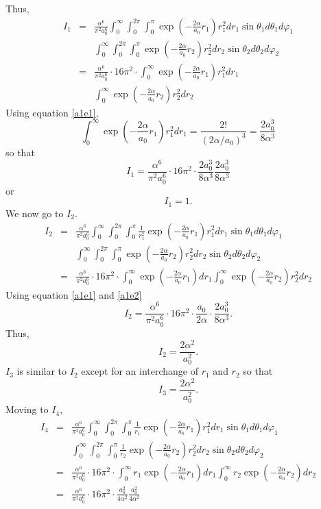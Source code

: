 \documentclass{article}
\numberwithin{equation}{section}
\begin{document}
Thus,
\begin{eqnarray*}
I_1 &=& \frac{\alpha^6}{\pi^2 a_0^6}
\int_0^\infty\int_0^{2\pi}\int_0^\pi\exp\left(-\frac{2\alpha}{a_0}r_1
	\right) r_1^2dr_1\sin\theta_1d\theta_1d\varphi_1 \\
 & & 
\int_0^\infty\int_0^{2\pi}\int_0^\pi\exp\left(-\frac{2\alpha}{a_0}r_2
	\right) r_2^2dr_2\sin\theta_2d\theta_2d\varphi_2 \\
 &=& \frac{\alpha^6}{\pi^2 a_0^6}\cdot 16\pi^2 \cdot
 \int_0^\infty\exp\left(-\frac{2\alpha}{a_0}r_1\right)r_1^2dr_1 \\
 & & \int_0^\infty\exp\left(-\frac{2\alpha}{a_0}r_2\right)r_2^2dr_2 
\end{eqnarray*}
Using equation \eqref{a1e1},
\[
\int_0^\infty\exp\left(-\frac{2\alpha}{a_0}r_1\right)r_1^2dr_1 = 
\frac{2!}{(2\alpha/a_0)^3} = \frac{2a_0^3}{8\alpha^3}
\]
so that
\[
I_1 = \frac{\alpha^6}{\pi^2 a_0^6}\cdot 16\pi^2 \cdot
 \frac{2a_0^3}{8\alpha^3}\frac{2a_0^3}{8\alpha^3}
\]
or
\begin{equation}\label{s5e73}
I_1 = 1.
\end{equation}
We now go to $I_2$.
\begin{eqnarray*}
I_2 &=& \frac{\alpha^6}{\pi^2 a_0^6}
\int_0^\infty\int_0^{2\pi}\int_0^\pi
\frac{1}{r_1^2}\exp\left(-\frac{2\alpha}{a_0}r_1\right)
r_1^2dr_1\sin\theta_1d\theta_1d\varphi_1 \\
 & & 
\int_0^\infty\int_0^{2\pi}\int_0^\pi\exp\left(-\frac{2\alpha}{a_0}r_2
	\right) r_2^2dr_2\sin\theta_2d\theta_2d\varphi_2 \\
 &=& \frac{\alpha^6}{\pi^2 a_0^6}\cdot 16\pi^2 \cdot
 \int_0^\infty\exp\left(-\frac{2\alpha}{a_0}r_1\right)dr_1 
 \int_0^\infty\exp\left(-\frac{2\alpha}{a_0}r_2\right)r_2^2dr_2 
\end{eqnarray*}
Using equation \eqref{a1e1} and \eqref{a1e2}
\[
I_2 = \frac{\alpha^6}{\pi^2 a_0^6}\cdot 16\pi^2 \cdot \frac{a_0}{2\alpha}
\cdot \frac{2a_0^3}{8\alpha^3}.
\]
Thus,
\begin{equation}\label{s5e74}
I_2 = \frac{2\alpha^2}{a_0^2}.
\end{equation}
$I_3$ is similar to $I_2$ except for an interchange of $r_1$ and $r_2$ so
that
\begin{equation}\label{s5e75}
I_3 = \frac{2\alpha^2}{a_0^2}.
\end{equation}
Moving to $I_4$,
\begin{eqnarray*}
I_4 &=& \frac{\alpha^6}{\pi^2 a_0^6}
\int_0^\infty\int_0^{2\pi}\int_0^\pi
\frac{1}{r_1}\exp\left(-\frac{2\alpha}{a_0}r_1\right)
r_1^2dr_1\sin\theta_1d\theta_1d\varphi_1 \\
 & & 
\int_0^\infty\int_0^{2\pi}\int_0^\pi
\frac{1}{r_2}\exp\left(-\frac{2\alpha}{a_0}r_2\right)
r_2^2dr_2\sin\theta_2d\theta_2d\varphi_2 \\
&=& \frac{\alpha^6}{\pi^2 a_0^6} \cdot 16\pi^2 \cdot
\int_0^\infty r_1\exp\left(-\frac{2\alpha}{a_0}r_1\right)dr_1
\int_0^\infty r_2\exp\left(-\frac{2\alpha}{a_0}r_2\right)dr_2 \\
&=& \frac{\alpha^6}{\pi^2 a_0^6} \cdot 16\pi^2 \cdot
\frac{a_0^2}{4\alpha^2}\frac{a_0^2}{4\alpha^2}
\end{eqnarray*}
\end{document}
